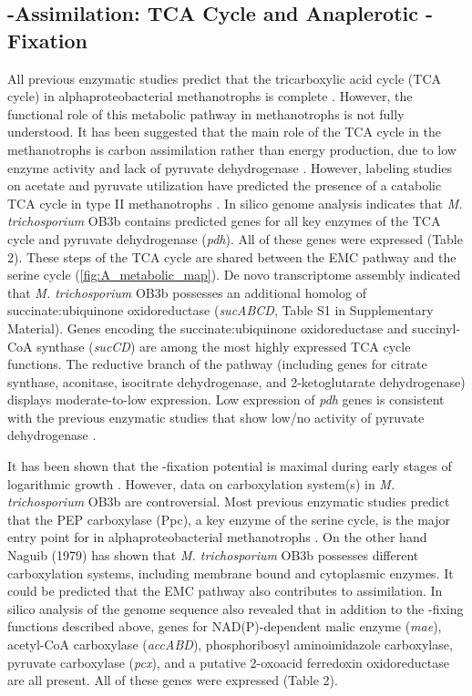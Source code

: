 \subsection{-Assimilation: TCA Cycle and Anaplerotic -Fixation}
All previous enzymatic studies predict that the tricarboxylic acid cycle (TCA cycle) in alphaproteobacterial methanotrophs is complete \cite{trotsenko2008}.
However, the functional role of this metabolic pathway in methanotrophs is not fully understood.
It has been suggested that the main role of the TCA cycle in the methanotrophs is carbon assimilation rather than energy production, due to low enzyme activity and lack of pyruvate dehydrogenase \cite{trotsenko1976, anthony1982, shishkina1982, trotsenko2008}.
However, labeling studies on acetate and pyruvate utilization have predicted the presence of a catabolic TCA cycle in type II methanotrophs \cite{wadzinski1975, higgins1981}.
In silico genome analysis indicates that \textit{M. trichosporium} OB3b contains predicted genes for all key enzymes of the TCA cycle and pyruvate dehydrogenase (\textit{pdh}).
All of these genes were expressed (Table 2).
These steps of the TCA cycle are shared between the EMC pathway and the serine cycle (\ref{fig:A_metabolic_map}).
De novo transcriptome assembly indicated that \textit{M. trichosporium} OB3b possesses an additional homolog of succinate:ubiquinone oxidoreductase (\textit{sucABCD}, Table S1 in Supplementary Material).
Genes encoding the succinate:ubiquinone oxidoreductase and succinyl-CoA synthase (\textit{sucCD}) are among the most highly expressed TCA cycle functions.
The reductive branch of the pathway (including genes for citrate synthase, aconitase, isocitrate dehydrogenase, and 2-ketoglutarate dehydrogenase) displays moderate-to-low expression.
Low expression of \textit{pdh} genes is consistent with the previous enzymatic studies that show low/no activity of pyruvate dehydrogenase \cite{trotsenko1976}.

It has been shown that the -fixation potential is maximal during early stages of logarithmic growth \cite{park1991, park1992}.
However, data on carboxylation system(s) in \textit{M. trichosporium} OB3b are controversial.
Most previous enzymatic studies predict that the PEP carboxylase (Ppc), a key enzyme of the serine cycle, is the major entry point for  in alphaproteobacterial methanotrophs \cite{shishkina1982}.
On the other hand Naguib (1979) has shown that \textit{M. trichosporium} OB3b possesses different carboxylation systems, including membrane bound and cytoplasmic enzymes.
It could be predicted that the EMC pathway also contributes to  assimilation.
In silico analysis of the genome sequence also revealed that in addition to the -fixing functions described above, genes for NAD(P)-dependent malic enzyme (\textit{mae}), acetyl-CoA carboxylase (\textit{accABD}), phosphoribosyl aminoimidazole carboxylase, pyruvate carboxylase (\textit{pcx}), and a putative 2-oxoacid ferredoxin oxidoreductase are all present.
All of these genes were expressed (Table 2).


